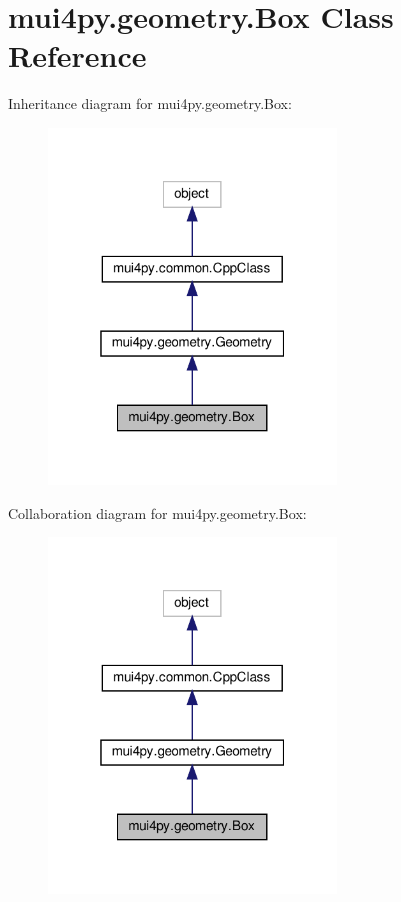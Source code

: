 \hypertarget{classmui4py_1_1geometry_1_1_box}{}\section{mui4py.\+geometry.\+Box Class Reference}
\label{classmui4py_1_1geometry_1_1_box}


Inheritance diagram for mui4py.\+geometry.\+Box\+:
\nopagebreak
\begin{figure}[H]
\begin{center}
\leavevmode
\includegraphics[width=217pt]{classmui4py_1_1geometry_1_1_box__inherit__graph}
\end{center}
\end{figure}


Collaboration diagram for mui4py.\+geometry.\+Box\+:
\nopagebreak
\begin{figure}[H]
\begin{center}
\leavevmode
\includegraphics[width=217pt]{classmui4py_1_1geometry_1_1_box__coll__graph}
\end{center}
\end{figure}
